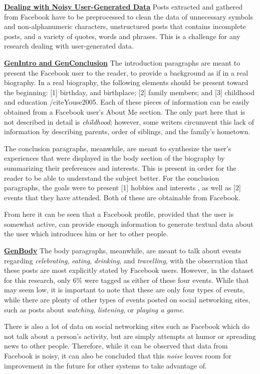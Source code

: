 \underline{\textbf{Dealing with Noisy User-Generated Data}}
Posts extracted and gathered from Facebook have to be preprocessed to clean the data of unnecessary symbols and non-alphanumeric characters, unstructured posts that contains incomplete posts, and a variety of quotes, words and phrases. This is a challenge for any research dealing with user-generated data.

\underline{\textbf{GenIntro and GenConclusion}}
The introduction paragraphs are meant to present the Facebook user to the reader, to provide a background as if in a real biography. In a real biography, the following elements should be present toward the beginning: [1] birthday, and birthplace; [2] family members; and [3] childhood and education /cite{Youse2005}. Each of these pieces of information can be easily obtained from a Facebook user’s About Me section. The only part here that is not described in detail is \textit{childhood}; however, some writers circumvent this lack of information by describing parents, order of siblings, and the family’s hometown.

The conclusion paragraphs, meanwhile, are meant to synthesize the user’s experiences that were displayed in the body section of the biography by summarizing their preferences and interests. This is present in order for the reader to be able to understand the subject better. For the conclusion paragraphs, the goals were to present [1] hobbies and interests \cite{Youse2005}, as well as [2] events that they have attended. Both of these are obtainable from Facebook.

From here it can be seen that a Facebook profile, provided that the user is somewhat active, can provide enough information to generate textual data about the user which introduces him or her to other people.

\underline{\textbf{GenBody}}
The body paragraphs, meanwhile, are meant to talk about events regarding \textit{celebrating}, \textit{eating}, \textit{drinking}, and \textit{travelling}, with the observation that these posts are most explicitly stated by Facebook users. However, in the dataset for this research, only 6\% were tagged as either of these four events. While that may seem low, it is important to note that these are only four types of events, while there are plenty of other types of events posted on social networking sites, such as posts about \textit{watching}, \textit{listening}, or \textit{playing a game}. 

There is also a lot of data on social networking sites such as Facebook which do not talk about a person’s activity, but are simply attempts at humor or spreading news to other people. Therefore, while it can be observed that data from Facebook is noisy, it can also be concluded that this \textit{noise} leaves room for improvement in the future for other systems to take advantage of.

